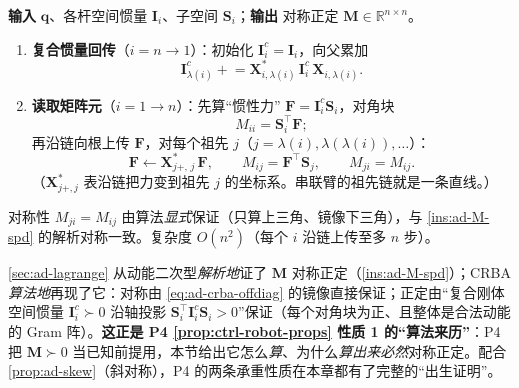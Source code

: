 \begin{algo}
\label{alg:ad-crba}
\textbf{输入} $\mathbf{q}$、各杆空间惯量 $\mathbf{I}_i$、子空间 $\mathbf{S}_i$；\textbf{输出} 对称正定 $\mathbf{M}\in\mathbb{R}^{n\times n}$。
\begin{enumerate}
  \item \textbf{复合惯量回传}（$i=n\to1$）：初始化 $\mathbf{I}^c_i=\mathbf{I}_i$，向父累加
  \begin{equation}
    \mathbf{I}^c_{\lambda(i)}\mathrel{+}=\mathbf{X}^{*}_{i,\lambda(i)}\,\mathbf{I}^c_i\,\mathbf{X}_{i,\lambda(i)}. \label{eq:ad-crba-Ic}
  \end{equation}
  \item \textbf{读取矩阵元}（$i=1\to n$）：先算“惯性力” $\mathbf{F}=\mathbf{I}^c_i\mathbf{S}_i$，对角块
  \begin{equation}
    M_{ii}=\mathbf{S}_i^\top\mathbf{F}; \label{eq:ad-crba-diag}
  \end{equation}
  再沿链向根上传 $\mathbf{F}$，对每个祖先 $j$（$j=\lambda(i),\lambda(\lambda(i)),\dots$）：
  \begin{equation}
    \mathbf{F}\leftarrow\mathbf{X}^{*}_{j+,\,j}\,\mathbf{F},\qquad M_{ij}=\mathbf{F}^\top\mathbf{S}_j,\qquad M_{ji}=M_{ij}. \label{eq:ad-crba-offdiag}
  \end{equation}
  （$\mathbf{X}^*_{j+,j}$ 表沿链把力变到祖先 $j$ 的坐标系。串联臂的祖先链就是一条直线。）
\end{enumerate}
对称性 $M_{ji}=M_{ij}$ 由算法\emph{显式}保证（只算上三角、镜像下三角），与 \cref{ins:ad-M-spd} 的解析对称一致。复杂度 $O(n^2)$（每个 $i$ 沿链上传至多 $n$ 步）。
\end{algo}

\begin{insight}[CRBA 的对称正定 = Euler--Lagrange 结论的算法级再现]
\label{ins:ad-crba-struct}
\cref{sec:ad-lagrange} 从动能二次型\emph{解析地}证了 $\mathbf{M}$ 对称正定（\cref{ins:ad-M-spd}）；CRBA \emph{算法地}再现了它：对称由 \cref{eq:ad-crba-offdiag} 的镜像直接保证；正定由“复合刚体空间惯量 $\mathbf{I}^c_i\succ0$ 沿轴投影 $\mathbf{S}_i^\top\mathbf{I}^c_i\mathbf{S}_i>0$”保证（每个对角块为正、且整体是合法动能的 Gram 阵）。\textbf{这正是 P4 \cref{prop:ctrl-robot-props} 性质 1 的“算法来历”}：P4 把 $\mathbf{M}\succ0$ 当已知前提用，本节给出它怎么\emph{算}、为什么\emph{算出来必然}对称正定。配合 \cref{prop:ad-skew}（斜对称），P4 的两条承重性质在本章都有了完整的“出生证明”。
\end{insight}


